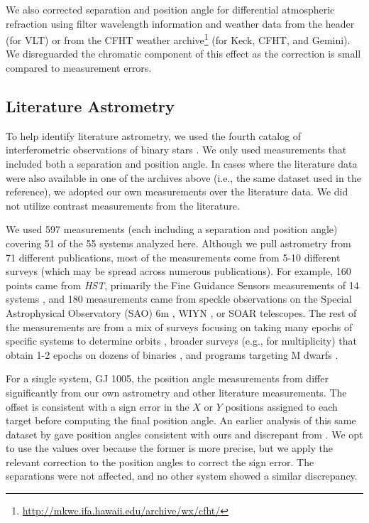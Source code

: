 \documentclass[twocolumn]{aastex62}
\begin{document}
We also corrected separation and position angle for differential atmospheric refraction \citep[DAR, ][]{2010SPIE.7736E..1IL} using filter wavelength information and weather data from the header (for VLT) or from the CFHT weather archive\footnote{\href{http://mkwc.ifa.hawaii.edu/archive/wx/cfht/}{http://mkwc.ifa.hawaii.edu/archive/wx/cfht/}} (for Keck, CFHT, and Gemini). We disreguarded the chromatic component of this effect as the correction is small compared to measurement errors. 


\subsection{Literature Astrometry}\label{sec:litas}

To help identify literature astrometry, we used the fourth catalog of interferometric observations of binary stars \citep[INT4,][]{Hartkopf:2001}. We only used measurements that included both a separation and position angle. In cases where the literature data were also available in one of the archives above (i.e., the same dataset used in the reference), we adopted our own measurements over the literature data. We did not utilize contrast measurements from the literature.

We used 597 measurements (each including a separation and position angle) covering 51 of the 55 systems analyzed here. Although we pull astrometry from 71 different publications, most of the measurements come from 5-10 different surveys (which may be spread across numerous publications). For example, 160 points came from {\it HST}, primarily the Fine Guidance Sensors measurements of 14 systems \citep[e.g.,][]{Benedict2016}, and 180 measurements came from speckle observations on the Special Astrophysical Observatory (SAO) 6m \citep[e.g.,][]{Bag2002}, WIYN \citep[e.g.,][]{Hor2017}, or SOAR \citep[e.g.,][]{Tok2017} telescopes. The rest of the measurements are from a mix of surveys focusing on taking many epochs of specific systems to determine orbits \citep[e.g.,][]{Koh2012}, broader surveys (e.g., for multiplicity) that obtain 1-2 epochs on dozens of binaries \citep[e.g.,][]{Jnn2012}, and programs targeting M dwarfs \citep[e.g.,][]{Mason2018}.

For a single system, GJ 1005, the position angle measurements from \citet{Benedict2016} differ significantly from our own astrometry and other literature measurements. The offset is consistent with a sign error in the $X$ or $Y$ positions assigned to each target before computing the final position angle. An earlier analysis of this same dataset by \citet{1998AJ....116.1440H} gave position angles consistent with ours and discrepant from \citet{Benedict2016}. We opt to use the \citet{Benedict2016} values over \citet{1998AJ....116.1440H} because the former is more precise, but we apply the relevant correction to the \citet{Benedict2016} position angles to correct the sign error. The separations were not affected, and no other system showed a similar discrepancy. 
\end{document}
